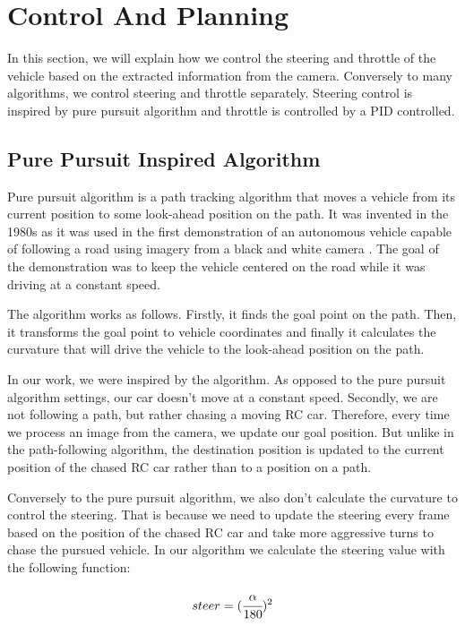 \section{Control And Planning}
In this section, we will explain how we control the steering and throttle of the vehicle based on the extracted information from the camera. Conversely to many algorithms, we control steering and throttle separately. Steering control is inspired by pure pursuit algorithm and throttle is controlled by a PID controlled.


\subsection{Pure Pursuit Inspired Algorithm}
Pure pursuit algorithm is a path tracking algorithm that moves a vehicle from its current position to some look-ahead position on the path. It was invented in the 1980s as it was used in the first demonstration of an autonomous vehicle capable of following a road using imagery from a black and white camera \cite{pure_pursuit_orig}. The goal of the demonstration was to keep the vehicle centered on the road while it was driving at a constant speed.\par


The algorithm works as follows. Firstly, it finds the goal point on the path. Then, it transforms the goal point to vehicle coordinates and finally it calculates the curvature that will drive the vehicle to the look-ahead position on the path. \par


In our work, we were inspired by the algorithm. As opposed to the pure pursuit algorithm settings, our car doesn't move at a constant speed. Secondly, we are not following a path, but rather chasing a moving RC car. Therefore, every time we process an image from the camera, we update our goal position. But unlike in the path-following algorithm, the destination position is updated to the current position of the chased RC car rather than to a position on a path. \par
Conversely to the pure pursuit algorithm, we also don't calculate the curvature to control the steering. That is because we need to update the steering every frame based on the position of the chased RC car and take more aggressive turns to chase the pursued vehicle. In our algorithm we calculate the steering value with the following function:

\begin{equation}steer = (\cfrac{\alpha}{\textrm{180}})^{2}\end{equation}


